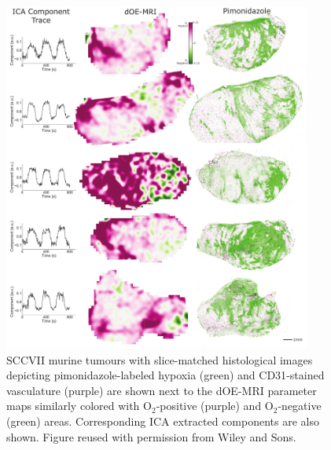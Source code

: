 \begin{figure}[htbp]
   \centering
   \includegraphics[width=0.9\textwidth]{oemri_thesis1/oemri_thesis1-images/fig6_sccvii.pdf} %
   \caption{SCCVII murine tumours with slice-matched histological images depicting pimonidazole-labeled hypoxia (green) and \acs{CD31}-stained vasculature (purple) are shown next to the \acs{dOE-MRI} parameter maps similarly colored with O$_2$-positive (purple) and O$_2$-negative (green) areas. Corresponding \acs{ICA} extracted components are also shown. Figure reused with permission from Wiley and Sons.
   \label{fig_sccvii}}
\end{figure}
